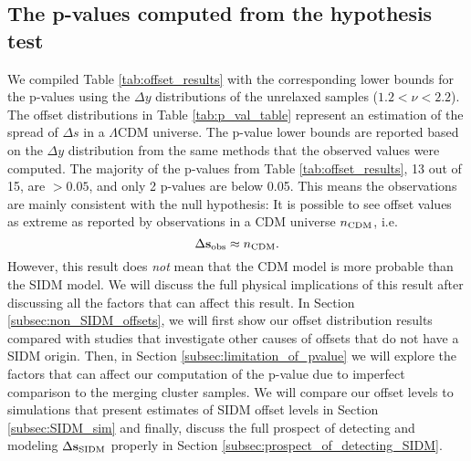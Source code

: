 \subsection{The p-values computed from the hypothesis test}
We compiled Table \ref{tab:offset_results} with the corresponding lower bounds
for the p-values using
the $\Delta y$ distributions of the unrelaxed samples ($1.2 < \nu < 2.2$). 
The offset distributions in Table \ref{tab:p_val_table}
represent an estimation of the spread of $\Delta s$ in a $\Lambda$CDM universe.
The p-value lower bounds are reported based on the $\Delta y$ distribution 
from the same methods that the observed values were computed. 
The majority of the p-values from Table \ref{tab:offset_results}, 13 out of 15, are
$ > 0.05$, and only 2 p-values are below 0.05. 
This means the observations are mainly consistent with the null hypothesis: 
It is possible to see offset values as extreme as reported by observations
in a CDM universe $n_{\rm CDM}$, i.e. 
\begin{equation}
\Delta {\bf s}_{\rm obs} \approx n_{\rm CDM}. 
\end{equation}
However, this result does {\it not} mean that the CDM model is more probable than the SIDM model. 
We will discuss the full physical implications of this result after discussing
all the factors that can affect this result. 
In Section \ref{subsec:non_SIDM_offsets},
we will first show our offset distribution results compared with
studies that investigate other causes of offsets that do not have a SIDM origin.
Then, in Section \ref{subsec:limitation_of_pvalue}
we will explore the factors that can affect our computation of the p-value due
to imperfect comparison to the merging cluster samples.   
We will compare our offset levels to simulations that present
estimates of SIDM offset levels in Section \ref{subsec:SIDM_sim}
and finally, discuss the full prospect of detecting and modeling 
$\Delta {\bf s}_{\rm SIDM}$ properly in Section
\ref{subsec:prospect_of_detecting_SIDM}.

